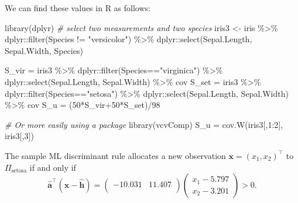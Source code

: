 \documentclass[
]{book}
\newenvironment{Shaded}{\begin{snugshade}}{\end{snugshade}}
\newcommand{\CommentTok}[1]{\textcolor[rgb]{0.56,0.35,0.01}{\textit{#1}}}
\newcommand{\DecValTok}[1]{\textcolor[rgb]{0.00,0.00,0.81}{#1}}
\newcommand{\FunctionTok}[1]{\textcolor[rgb]{0.00,0.00,0.00}{#1}}
\newcommand{\NormalTok}[1]{#1}
\newcommand{\OtherTok}[1]{\textcolor[rgb]{0.56,0.35,0.01}{#1}}
\newcommand{\SpecialCharTok}[1]{\textcolor[rgb]{0.00,0.00,0.00}{#1}}
\newcommand{\StringTok}[1]{\textcolor[rgb]{0.31,0.60,0.02}{#1}}
\theoremstyle{definition}
\theoremstyle{definition}
\theoremstyle{definition}
\theoremstyle{definition}
\theoremstyle{remark}
\begin{document}
We can find these values in R as follows:

\begin{Shaded}
\begin{Highlighting}[]
\FunctionTok{library}\NormalTok{(dplyr)}
\CommentTok{\# select two measurements and two species}
\NormalTok{iris3 }\OtherTok{\textless{}{-}}\NormalTok{ iris }\SpecialCharTok{\%\textgreater{}\%}\NormalTok{ dplyr}\SpecialCharTok{::}\FunctionTok{filter}\NormalTok{(Species }\SpecialCharTok{!=} \StringTok{"versicolor"}\NormalTok{) }\SpecialCharTok{\%\textgreater{}\%}
\NormalTok{  dplyr}\SpecialCharTok{::}\FunctionTok{select}\NormalTok{(Sepal.Length, Sepal.Width, Species)}

\NormalTok{S\_vir }\OtherTok{=}\NormalTok{ iris3 }\SpecialCharTok{\%\textgreater{}\%}\NormalTok{ dplyr}\SpecialCharTok{::}\FunctionTok{filter}\NormalTok{(Species}\SpecialCharTok{==}\StringTok{"virginica"}\NormalTok{) }\SpecialCharTok{\%\textgreater{}\%}
\NormalTok{  dplyr}\SpecialCharTok{::}\FunctionTok{select}\NormalTok{(Sepal.Length, Sepal.Width) }\SpecialCharTok{\%\textgreater{}\%} 
\NormalTok{  cov}
\NormalTok{S\_set }\OtherTok{=}\NormalTok{ iris3 }\SpecialCharTok{\%\textgreater{}\%}\NormalTok{ dplyr}\SpecialCharTok{::}\FunctionTok{filter}\NormalTok{(Species}\SpecialCharTok{==}\StringTok{"setosa"}\NormalTok{) }\SpecialCharTok{\%\textgreater{}\%} 
\NormalTok{  dplyr}\SpecialCharTok{::}\FunctionTok{select}\NormalTok{(Sepal.Length, Sepal.Width) }\SpecialCharTok{\%\textgreater{}\%} 
\NormalTok{  cov}
\NormalTok{S\_u }\OtherTok{=}\NormalTok{ (}\DecValTok{50}\SpecialCharTok{*}\NormalTok{S\_vir}\SpecialCharTok{+}\DecValTok{50}\SpecialCharTok{*}\NormalTok{S\_set)}\SpecialCharTok{/}\DecValTok{98}


\CommentTok{\# Or more easily using a package}
\FunctionTok{library}\NormalTok{(vcvComp)}
\NormalTok{S\_u }\OtherTok{=} \FunctionTok{cov.W}\NormalTok{(iris3[,}\DecValTok{1}\SpecialCharTok{:}\DecValTok{2}\NormalTok{], iris3[,}\DecValTok{3}\NormalTok{]) }
\end{Highlighting}
\end{Shaded}

The sample ML discriminant rule allocates a new observation \(\mathbf x= (x_1, x_2)^\top\) to \(\Pi_{\mbox{setosa}}\) if and only if
\[ \hat{\mathbf a}^\top (\mathbf x- \hat{\mathbf h}) = \begin{pmatrix}-10.031&11.407 \\\end{pmatrix} \begin{pmatrix} x_1 - 5.797 \\ x_2 - 3.201 \end{pmatrix} > 0.\]
\end{document}
